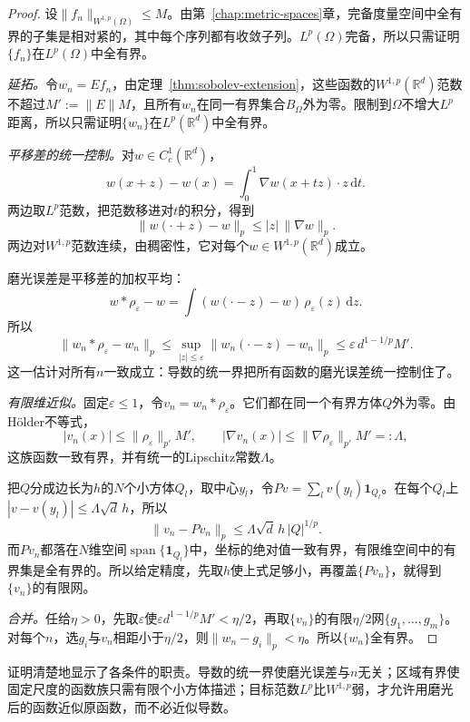 \begin{proof}
设$\lVert f_n\rVert_{W^{1,p}(\Omega)}\leq M$。由第~\ref{chap:metric-spaces}章，完备度量空间中全有界的子集是相对紧的，其中每个序列都有收敛子列。$L^p(\Omega)$完备，所以只需证明$\{f_n\}$在$L^p(\Omega)$中全有界。

\emph{延拓。}令$w_n=Ef_n$，由定理~\ref{thm:sobolev-extension}，这些函数的$W^{1,p}(\mathbb R^d)$范数不超过$M':=\lVert E\rVert M$，且所有$w_n$在同一有界集合$B_\Omega$外为零。限制到$\Omega$不增大$L^p$距离，所以只需证明$\{w_n\}$在$L^p(\mathbb R^d)$中全有界。

\emph{平移差的统一控制。}对$w\in C_c^1(\mathbb R^d)$，
\[
w(x+z)-w(x)=\int_0^1\nabla w(x+tz)\cdot z\,\mathrm dt .
\]
两边取$L^p$范数，把范数移进对$t$的积分，得到
\[
\lVert w(\cdot+z)-w\rVert_p\leq|z|\,\lVert\nabla w\rVert_p .
\]
两边对$W^{1,p}$范数连续，由稠密性，它对每个$w\in W^{1,p}(\mathbb R^d)$成立。

磨光误差是平移差的加权平均：
\[
w*\rho_\varepsilon-w=\int(w(\cdot-z)-w)\,\rho_\varepsilon(z)\,\mathrm dz .
\]
所以
\[
\lVert w_n*\rho_\varepsilon-w_n\rVert_p\leq\sup_{|z|\leq\varepsilon}\lVert w_n(\cdot-z)-w_n\rVert_p\leq\varepsilon\,d^{1-1/p}M' .
\]
这一估计对所有$n$一致成立：导数的统一界把所有函数的磨光误差统一控制住了。

\emph{有限维近似。}固定$\varepsilon\leq1$，令$v_n=w_n*\rho_\varepsilon$。它们都在同一个有界方体$Q$外为零。由Hölder不等式，
\[
|v_n(x)|\leq\lVert\rho_\varepsilon\rVert_{p'}M',\qquad
|\nabla v_n(x)|\leq\lVert\nabla\rho_\varepsilon\rVert_{p'}M'=:\Lambda ,
\]
这族函数一致有界，并有统一的Lipschitz常数$\Lambda$。

把$Q$分成边长为$h$的$N$个小方体$Q_l$，取中心$y_l$，令$Pv=\sum_lv(y_l)\mathbf 1_{Q_l}$。在每个$Q_l$上$|v-v(y_l)|\leq\Lambda\sqrt d\,h$，所以
\[
\lVert v_n-Pv_n\rVert_p\leq\Lambda\sqrt d\,h\,|Q|^{1/p} .
\]
而$Pv_n$都落在$N$维空间$\operatorname{span}\{\mathbf 1_{Q_l}\}$中，坐标的绝对值一致有界，有限维空间中的有界集是全有界的。所以给定精度，先取$h$使上式足够小，再覆盖$\{Pv_n\}$，就得到$\{v_n\}$的有限网。

\emph{合并。}任给$\eta>0$，先取$\varepsilon$使$\varepsilon d^{1-1/p}M'<\eta/2$，再取$\{v_n\}$的有限$\eta/2$网$\{g_1,\ldots,g_m\}$。对每个$n$，选$g_i$与$v_n$相距小于$\eta/2$，则$\lVert w_n-g_i\rVert_p<\eta$。所以$\{w_n\}$全有界。
\end{proof}

证明清楚地显示了各条件的职责。导数的统一界使磨光误差与$n$无关；区域有界使固定尺度的函数族只需有限个小方体描述；目标范数$L^p$比$W^{1,p}$弱，才允许用磨光后的函数近似原函数，而不必近似导数。

